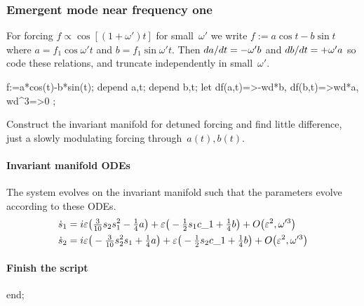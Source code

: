 \subsubsection{Emergent mode near frequency one}
For forcing \(f\propto \cos[(1+\omega')t]\) for small~\(\omega'\) we write \(f:=a\cos t-b\sin t\) where \(a=f_1\cos \omega't\) and \(b=f_1\sin \omega't\).   Then \(\de ta=-\omega'b\) and \(\de tb=+\omega'a\) so code these relations, and truncate independently in small~\(\omega'\).
\begin{reduce}
f:=a*cos(t)-b*sin(t);
depend a,t; depend b,t;
let { df(a,t)=>-wd*b, df(b,t)=>wd*a, wd^3=>0 }; 
\end{reduce}
Construct the invariant manifold for detuned forcing and find little difference, just a slowly modulating forcing through~\(a(t),b(t)\).

\paragraph{Invariant manifold ODEs}
The system evolves on the invariant manifold such
that the parameters evolve according to these ODEs.
\begin{align*}&
\dot s_{1}=i \varepsilon \big(\tfrac{3}{10} s_{2} s_{1}^{2}-\tfrac{1}{4} a\big)+\varepsilon \big(-\tfrac{1}{2} s_
{1} c\_1+\tfrac{1}{4} b\big)+O\big(\varepsilon ^{2},\omega'^3\big)
\\&
\dot s_{2}=i \varepsilon \big(-\tfrac{3}{10} s_{2}^{2} s_{1}+\tfrac{1}{4} a\big)+\varepsilon \big(-\tfrac{1}{2} s
_{2} c\_1+\tfrac{1}{4} b\big)+O\big(\varepsilon ^{2},\omega'^3\big)
\end{align*}





\paragraph{Finish the script}
\begin{reduce}
end;
\end{reduce}

